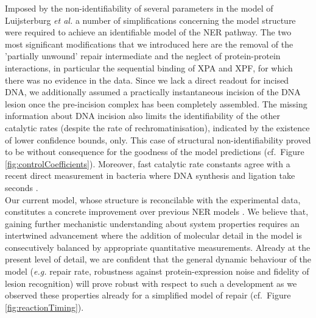 Imposed by the non-identifiability of several parameters in the model of Luijsterburg \textit{et al.} \cite{Luijsterburg2010} a number of simplifications concerning the model structure were required to achieve an identifiable model of the NER pathway. The two most significant modifications that we introduced here are the removal of the 'partially unwound' repair intermediate and the neglect of protein-protein interactions, in particular the sequential binding of XPA and XPF, for which there was no evidence in the data. Since we lack a direct readout for incised DNA, we additionally assumed a practically instantaneous incision of the DNA lesion once the pre-incision complex has been completely assembled. The missing information about DNA incision also limits the identifiability of the other catalytic rates (despite the rate of rechromatinisation), indicated by the existence of lower confidence bounds, only. This case of structural non-identifiability proved to be without consequence for the goodness of the model predictions (cf.\ Figure \ref{fig:controlCoefficients}). Moreover, fast catalytic rate constants agree with a recent direct measurement in bacteria where DNA synthesis and ligation take seconds \cite{Uphoff2013}. \\
Our current model, whose structure is reconcilable with the experimental data, constitutes a concrete improvement over previous NER models \cite{Luijsterburg2010,Politi2005,Kesseler2007}. We believe that, gaining further mechanistic understanding about system properties requires an intertwined advancement where the addition of molecular detail in the model is consecutively balanced by appropriate quantitative measurements. Already at the present level of detail, we are confident that the general dynamic behaviour of the model (\textit{e.g.} repair rate, robustness against protein-expression noise and fidelity of lesion recognition) will prove robust with respect to such a development as we observed these properties already for a simplified model of repair (cf.\ Figure \ref{fig:reactionTiming}).    
       

